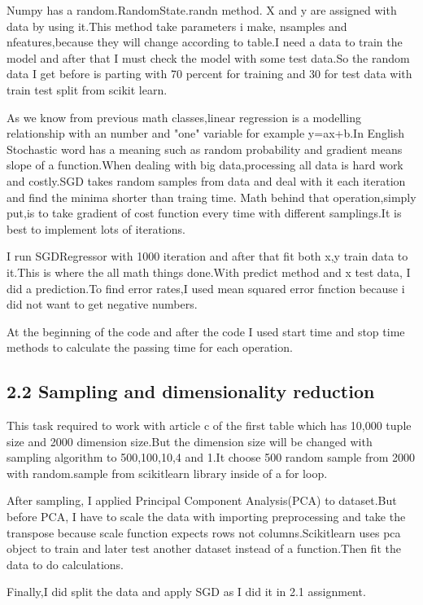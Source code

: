 \documentclass[onecolumn]{article}
\begin{document}
Numpy has a random.RandomState.randn method. X and y are assigned with data by using it.This method take parameters i make, nsamples and nfeatures,because they will change according to table.I need a data to train the model and after that I must check the model with some test data.So the random data I get before is parting with 70 percent for training and 30 for test data with train test split from scikit learn.

As we know from previous math classes,linear regression is a modelling relationship with an number and "one" variable for example y=ax+b.In English Stochastic word has a meaning such as random probability and gradient means slope of a function.When dealing with big data,processing all data is hard work and costly.SGD takes random samples from data and deal with it each iteration and find the minima shorter than traing time. Math behind that operation,simply put,is to take gradient of cost  function every time with different samplings.It is best to implement lots of iterations. 

I run SGDRegressor with 1000 iteration and after that fit both x,y train data to it.This is where the all math things done.With predict method and x test data, I did a prediction.To find error rates,I used mean squared error fınction because i did not want to get negative numbers.

At the beginning of the code and after the code I used start time and stop time methods to calculate the passing time for each operation.


\subsection*{2.2 Sampling and dimensionality reduction} %
This task required to work with article c of the first table which has 10,000 tuple size and 2000 dimension size.But the dimension size will be changed with sampling  algorithm  to 500,100,10,4 and 1.It choose 500 random sample from 2000 with random.sample from scikitlearn library inside of a for loop.

After sampling, I applied Principal Component Analysis(PCA) to dataset.But before PCA, I have to scale the data with importing preprocessing and take the transpose because scale function expects rows not columns.Scikitlearn uses pca object to train and later test another dataset instead of a function.Then fit the data to do calculations.

Finally,I did split the data and apply SGD as I did it in 2.1 assignment. 
\end{document}
